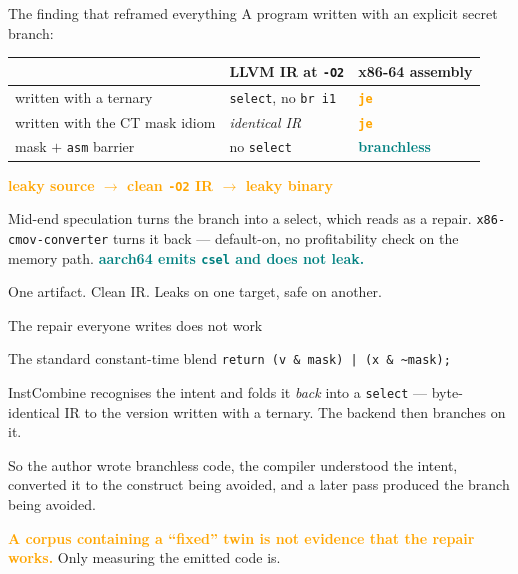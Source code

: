 \documentclass[aspectratio=169,10pt]{beamer}
\newcommand{\good}[1]{\textcolor{Teal}{\textbf{#1}}}
\newcommand{\bad}[1]{\textcolor{Orange}{\textbf{#1}}}
\newcommand{\code}[1]{\texttt{#1}}
\newcommand{\vs}{\textcolor{Muted}{$\rightarrow$}}
\begin{document}
\begin{frame}{The finding that reframed everything}
  A program written with an explicit secret branch:

  \begin{center}
  \begin{tabular}{@{}l l l@{}}
  \toprule
  & LLVM IR at \code{-O2} & x86-64 assembly \\
  \midrule
  written with a ternary          & \code{select}, no \code{br i1} & \bad{\code{je}} \\
  written with the CT mask idiom  & \emph{identical IR}            & \bad{\code{je}} \\
  mask $+$ \code{asm} barrier     & no \code{select}               & \good{branchless} \\
  \bottomrule
  \end{tabular}
  \end{center}

  \vspace{0.8em}
  \bad{leaky source \vs{} clean \code{-O2} IR \vs{} leaky binary}

  \vspace{0.5em}
  Mid-end speculation turns the branch into a select, which reads as a repair.
  \code{x86-cmov-converter} turns it back --- default-on, no profitability check on
  the memory path. \good{aarch64 emits \code{csel} and does not leak.}

  \vspace{0.5em}
  One artifact. Clean IR. Leaks on one target, safe on another.
\end{frame}

\begin{frame}{The repair everyone writes does not work}
  \begin{block}{The standard constant-time blend}
  \code{return (v \& mask) | (x \& \textasciitilde mask);}
  \end{block}

  \vspace{0.6em}
  InstCombine recognises the intent and folds it \emph{back} into a \code{select}
  --- byte-identical IR to the version written with a ternary. The backend then
  branches on it.

  \vspace{0.8em}
  So the author wrote branchless code, the compiler understood the intent,
  converted it to the construct being avoided, and a later pass produced the
  branch being avoided.

  \vspace{0.8em}
  \bad{A corpus containing a ``fixed'' twin is not evidence that the repair works.}
  Only measuring the emitted code is.
\end{frame}
\end{document}
